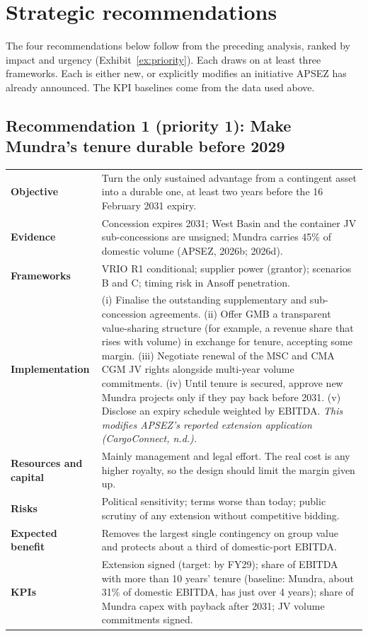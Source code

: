 \documentclass[12pt, a4paper]{article}
\newcommand{\tablesetup}{\footnotesize\renewcommand{\arraystretch}{1.25}\setlength{\tabcolsep}{4pt}}
\newcommand{\rowsep}{\addlinespace[3pt]}
\newcommand{\reclabel}[1]{\textbf{#1}}
\begin{document}
\section{Strategic recommendations}\label{sec:recs}
The four recommendations below follow from the preceding analysis, ranked by
impact and urgency (Exhibit~\ref{ex:priority}). Each draws on at least three
frameworks. Each is either new, or explicitly modifies an initiative APSEZ has
already announced. The KPI baselines come from the data used above.

\subsection{Recommendation 1 (priority 1): Make Mundra's tenure durable before 2029}
\begingroup\tablesetup
\begin{xltabular}{\linewidth}{P{30mm}L}
\toprule
\reclabel{Objective} & Turn the only sustained advantage from a contingent asset into a durable one, at least two years before the 16 February 2031 expiry. \\ \rowsep
\reclabel{Evidence} & Concession expires 2031; West Basin and the container JV sub-concessions are unsigned; Mundra carries 45\% of domestic volume (APSEZ, 2026b; 2026d). \\ \rowsep
\reclabel{Frameworks} & VRIO R1 conditional; supplier power (grantor); scenarios B and C; timing risk in Ansoff penetration. \\ \rowsep
\reclabel{Implementation} & (i) Finalise the outstanding supplementary and sub-concession agreements. (ii) Offer GMB a transparent value-sharing structure (for example, a revenue share that rises with volume) in exchange for tenure, accepting some margin. (iii) Negotiate renewal of the MSC and CMA CGM JV rights alongside multi-year volume commitments. (iv) Until tenure is secured, approve new Mundra projects only if they pay back before 2031. (v) Disclose an expiry schedule weighted by EBITDA. \textit{This modifies APSEZ's reported extension application (CargoConnect, n.d.).} \\ \rowsep
\reclabel{Resources and capital} & Mainly management and legal effort. The real cost is any higher royalty, so the design should limit the margin given up. \\ \rowsep
\reclabel{Risks} & Political sensitivity; terms worse than today; public scrutiny of any extension without competitive bidding. \\ \rowsep
\reclabel{Expected benefit} & Removes the largest single contingency on group value and protects about a third of domestic-port EBITDA. \\ \rowsep
\reclabel{KPIs} & Extension signed (target: by FY29); share of EBITDA with more than 10 years' tenure (baseline: Mundra, about 31\% of domestic EBITDA, has just over 4 years); share of Mundra capex with payback after 2031; JV volume commitments signed. \\
\bottomrule
\end{xltabular}
\endgroup
\end{document}
